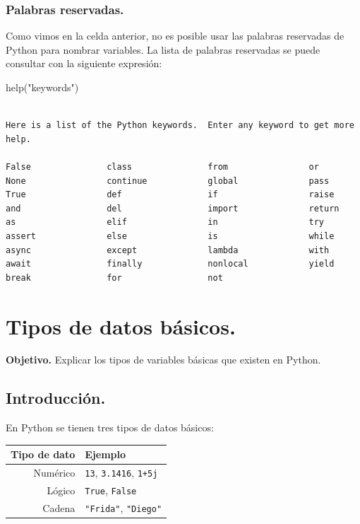 \documentclass[
  spanish,
  letterpaper,
]{scrbook}
\newenvironment{Shaded}{\begin{snugshade}}{\end{snugshade}}
\newcommand{\BuiltInTok}[1]{\textcolor[rgb]{0.00,0.23,0.31}{#1}}
\newcommand{\NormalTok}[1]{\textcolor[rgb]{0.00,0.23,0.31}{#1}}
\newcommand{\StringTok}[1]{\textcolor[rgb]{0.13,0.47,0.30}{#1}}
\theoremstyle{definition}
\theoremstyle{remark}
\begin{document}
\subsection{Palabras reservadas.}\label{sec-a-palabras_reservadas}

Como vimos en la celda anterior, no es posible usar las palabras
reservadas de Python para nombrar variables. La lista de palabras
reservadas se puede consultar con la siguiente expresión:

\begin{Shaded}
\begin{Highlighting}[]
\BuiltInTok{help}\NormalTok{(}\StringTok{"keywords"}\NormalTok{)}
\end{Highlighting}
\end{Shaded}

\begin{verbatim}

Here is a list of the Python keywords.  Enter any keyword to get more help.

False               class               from                or
None                continue            global              pass
True                def                 if                  raise
and                 del                 import              return
as                  elif                in                  try
assert              else                is                  while
async               except              lambda              with
await               finally             nonlocal            yield
break               for                 not                 
\end{verbatim}

\chapter{Tipos de datos básicos.}\label{sec-b-tipos-basicos}

\textbf{Objetivo.} Explicar los tipos de variables básicas que existen
en Python.

\section{Introducción.}\label{introducciuxf3n.}

En Python se tienen tres tipos de datos básicos:

\begin{longtable}[]{@{}rl@{}}
\toprule\noalign{}
Tipo de dato & Ejemplo \\
\midrule\noalign{}
\endhead
\bottomrule\noalign{}
\endlastfoot
Numérico & \texttt{13}, \texttt{3.1416}, \texttt{1+5j} \\
Lógico & \texttt{True}, \texttt{False} \\
Cadena & \texttt{"Frida"}, \texttt{"Diego"} \\
\end{longtable}
\end{document}
